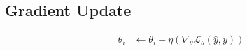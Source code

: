 \documentclass{article}
\begin{document}
\subsection{Gradient Update}
\begin{align}
	\theta_i & \gets \theta_i - \eta (\nabla_\theta \mathcal{L}_{\theta}(\hat{y}, y))
\end{align}

\printbibliography
\end{document}
